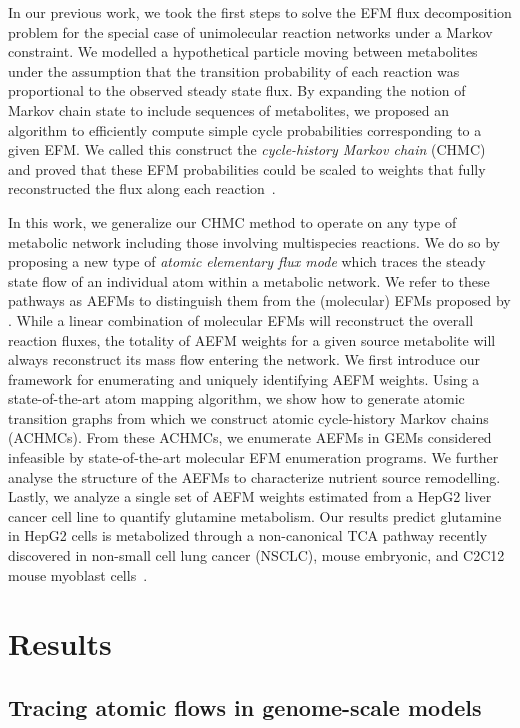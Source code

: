 \documentclass[12pt]{article}
\begin{document}
In our previous work, we took the first steps to solve the EFM flux
decomposition problem for the special case of unimolecular reaction
networks under a Markov constraint. We modelled a hypothetical particle
moving between metabolites under the assumption that the transition
probability of each reaction was proportional to the observed steady state
flux. By expanding the notion of Markov chain state to include sequences
of metabolites, we proposed an algorithm to efficiently compute simple
cycle probabilities corresponding to a given EFM. We called this construct
the \emph{cycle-history Markov chain} (CHMC) and proved that these EFM
probabilities could be scaled to weights that fully reconstructed the flux
along each reaction~\citep{ChitpinJustinG2023AMct}.

In this work, we generalize our CHMC method to operate on any type of
metabolic network including those involving multispecies reactions. We do
so by proposing a new type of \emph{atomic elementary flux mode} which
traces the steady state flow of an individual atom within a metabolic
network. We refer to these pathways as AEFMs to distinguish them from the
(molecular) EFMs proposed by \citeauthor{SchusterStefan1994Oefm}. While
a linear combination of molecular EFMs will reconstruct the overall
reaction fluxes, the totality of AEFM weights for a given source
metabolite will always reconstruct its mass flow entering the network. We
first introduce our framework for enumerating and uniquely identifying
AEFM weights. Using a state-of-the-art atom mapping algorithm, we show how
to generate atomic transition graphs from which we construct atomic
cycle-history Markov chains (ACHMCs). From these ACHMCs, we enumerate
AEFMs in GEMs considered infeasible by state-of-the-art molecular EFM
enumeration programs. We further analyse the structure of the AEFMs to
characterize nutrient source remodelling. Lastly, we analyze a single set
of AEFM weights estimated from a HepG2 liver cancer cell line to quantify
glutamine metabolism. Our results predict glutamine in HepG2 cells is
metabolized through a non-canonical TCA pathway recently discovered in
non-small cell lung cancer (NSCLC), mouse embryonic, and C2C12 mouse
myoblast cells~\citep{ArnoldPaigeK2022Anta}.

\section*{Results}

\subsection*{Tracing atomic flows in genome-scale models} %
\end{document}
